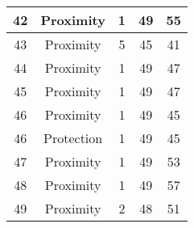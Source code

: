 \documentclass[results.tex]{subfiles}
\begin{document}
\begin{center}
\begin{tabular}{| c || c | c | c | c |}
            \hline
            42                      & Proximity                    & 1                      & 49                      & 55                   \\
            \hline
            43                      & Proximity                    & 5                      & 45                      & 41                   \\
            \hline
            44                      & Proximity                    & 1                      & 49                      & 47                   \\
            \hline
            45                      & Proximity                    & 1                      & 49                      & 47                   \\
            \hline
            46                      & Proximity                    & 1                      & 49                      & 45                   \\
            \hline
            46                      & Protection                   & 1                      & 49                      & 45                   \\
            \hline
            47                      & Proximity                    & 1                      & 49                      & 53                   \\
            \hline
            48                      & Proximity                    & 1                      & 49                      & 57                   \\
            \hline
            49                      & Proximity                    & 2                      & 48                      & 51                   \\
            \hline
        \end{tabular}
    \end{center}
\end{document}
